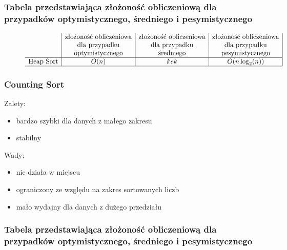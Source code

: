 \documentclass[polish,polish,a4paper]{article}
\begin{document}
\begin{spacing}{1.5}
\subsubsection*{Tabela przedstawiająca złożoność obliczeniową dla przypadków optymistycznego, średniego i pesymistycznego} 
\begin{figure}[H]
	
	\begin{equation*}
	\begin{array}{l|c|c|c|}

	&$złożoność obliczeniowa$&$złożoność obliczeniowa$&$złożoność obliczeniowa$\\
	&$dla przypadku$&$dla przypadku$&$dla przypadku$\\
	&$optymistycznego$&$średniego$&$pesymistycznego$\\
	\hline
	$Heap Sort$&O(n)&kek&O(n\log_{2}(n))\\
	\hline
	\end{array}
	\end{equation*}
\end{figure}

			\subsubsection*{Counting Sort}
Zalety:
\begin{itemize}
	\item bardzo szybki dla danych z małego zakresu
	\item stabilny
\end{itemize}
Wady:
\begin{itemize}
	\item nie działa w miejscu
	\item ograniczony ze względu na zakres sortowanych liczb
	\item mało wydajny dla danych z dużego przedziału
\end{itemize}


\subsubsection*{Tabela przedstawiająca złożoność obliczeniową dla przypadków optymistycznego, średniego i pesymistycznego} 
\begin{figure}[H]
	
	\begin{equation*}
	\begin{array}{l|c|c|c|}


\end{array}
\end{equation*}
\end{figure}
\end{spacing}
\end{document}
